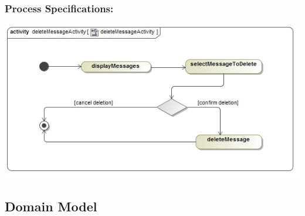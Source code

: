 \documentclass[a4paper,11pt]{article}
\begin{document}
\subsubsection{Process Specifications:} 
\includegraphics[width=1\linewidth]{./Images/PrivateMessage/deleteMessageActivity}

\newpage
\begin{center}
\section{\textbf{\huge{Domain Model}}}

\end{center}
\end{document}
